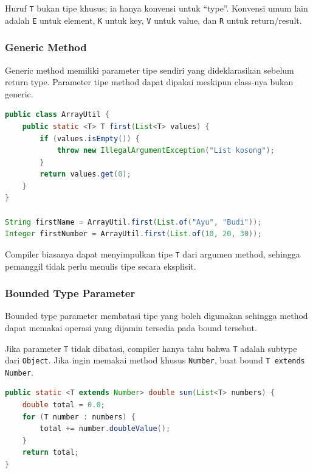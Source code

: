 Huruf \texttt{T} bukan tipe khusus; ia hanya konvensi untuk ``type''. Konvensi umum lain adalah \texttt{E} untuk element, \texttt{K} untuk key, \texttt{V} untuk value, dan \texttt{R} untuk return/result.

\subsubsection{Generic Method}

\begin{jawab}
Generic method memiliki parameter tipe sendiri yang dideklarasikan sebelum return type. Parameter tipe method dapat dipakai meskipun class-nya bukan generic.
\end{jawab}

\begin{lstlisting}[language=Java, caption={Generic method}, label={lst:generic-method}]
public class ArrayUtil {
    public static <T> T first(List<T> values) {
        if (values.isEmpty()) {
            throw new IllegalArgumentException("List kosong");
        }
        return values.get(0);
    }
}

String firstName = ArrayUtil.first(List.of("Ayu", "Budi"));
Integer firstNumber = ArrayUtil.first(List.of(10, 20, 30));
\end{lstlisting}

Compiler biasanya dapat menyimpulkan tipe \texttt{T} dari argumen method, sehingga pemanggil tidak perlu menulis tipe secara eksplisit.

\subsubsection{Bounded Type Parameter}

\begin{jawab}
Bounded type parameter membatasi tipe yang boleh digunakan sehingga method dapat memakai operasi yang dijamin tersedia pada bound tersebut.
\end{jawab}

Jika parameter \texttt{T} tidak dibatasi, compiler hanya tahu bahwa \texttt{T} adalah subtype dari \texttt{Object}. Jika ingin memakai method khusus \texttt{Number}, buat bound \texttt{T extends Number}.

\begin{lstlisting}[language=Java, caption={Bounded type parameter}, label={lst:bounded-type}]
public static <T extends Number> double sum(List<T> numbers) {
    double total = 0.0;
    for (T number : numbers) {
        total += number.doubleValue();
    }
    return total;
}
\end{lstlisting}

